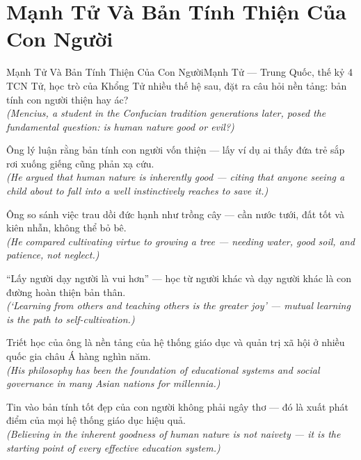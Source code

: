 \section{Mạnh Tử Và Bản Tính Thiện Của Con Người}
\begin{truyen}{Mạnh Tử Và Bản Tính Thiện Của Con Người}{Mạnh Tử --- Trung Quốc, thế kỷ 4 TCN}
 Tử, học trò của Khổng Tử nhiều thế hệ sau, đặt ra câu hỏi nền tảng: bản tính con người thiện hay ác?\\[4pt]
\textit{(Mencius, a student in the Confucian tradition generations later, posed the fundamental question: is human nature good or evil?)}

Ông lý luận rằng bản tính con người vốn thiện --- lấy ví dụ ai thấy đứa trẻ sắp rơi xuống giếng cũng phản xạ cứu.\\[4pt]
\textit{(He argued that human nature is inherently good --- citing that anyone seeing a child about to fall into a well instinctively reaches to save it.)}

Ông so sánh việc trau dồi đức hạnh như trồng cây --- cần nước tưới, đất tốt và kiên nhẫn, không thể bỏ bê.\\[4pt]
\textit{(He compared cultivating virtue to growing a tree --- needing water, good soil, and patience, not neglect.)}

``Lấy người dạy người là vui hơn'' --- học từ người khác và dạy người khác là con đường hoàn thiện bản thân.\\[4pt]
\textit{(`Learning from others and teaching others is the greater joy' --- mutual learning is the path to self-cultivation.)}

Triết học của ông là nền tảng của hệ thống giáo dục và quản trị xã hội ở nhiều quốc gia châu Á hàng nghìn năm.\\[4pt]
\textit{(His philosophy has been the foundation of educational systems and social governance in many Asian nations for millennia.)}

\end{truyen}
\begin{baihoc}
  Tin vào bản tính tốt đẹp của con người không phải ngây thơ --- đó là xuất phát điểm của mọi hệ thống giáo dục hiệu quả.\\[4pt]
  \textit{(Believing in the inherent goodness of human nature is not naivety --- it is the starting point of every effective education system.)}
\end{baihoc}

